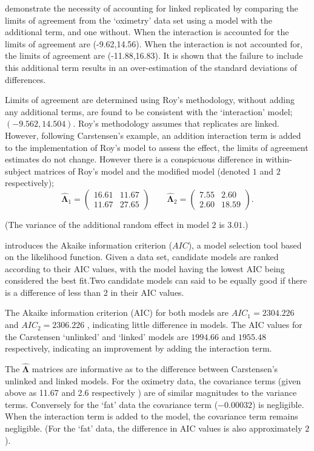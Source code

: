 \documentclass[12pt, a4paper]{report}
\theoremstyle{plain}
\theoremstyle{definition}
\theoremstyle{remark}
\begin{document}
\citet{BXC2008} demonstrate the necessity of accounting for linked replicated by comparing the limits of agreement from the `oximetry' data set using a model with the additional term, and one without. When the interaction is accounted for the limits of agreement are (-9.62,14.56). When the interaction is not accounted for, the limits of agreement are (-11.88,16.83). It is shown that the failure to include this additional term results in an over-estimation of the standard deviations of differences.

Limits of agreement are determined using Roy's methodology, without adding any additional terms, are found to be consistent with the `interaction' model; $(-9.562, 14.504 )$. Roy's methodology assumes that replicates are linked. However, following Carstensen's example, an addition interaction term is added to the implementation of Roy's model to assess the effect, the limits of agreement estimates do not change. However there is a conspicuous difference in within-subject matrices of Roy's model and the modified model (denoted $1$ and $2$ respectively);
\begin{equation}
\hat{\boldsymbol{\Lambda}}_{1}= \begin{pmatrix}
16.61 &	11.67\\
11.67 & 27.65 
\end{pmatrix}\qquad
\boldsymbol{\hat{\Lambda}}_{2}= \begin{pmatrix}
7.55 & 2.60 \\
2.60 & 18.59
\end{pmatrix}.
\end{equation}

\noindent (The variance of the additional random effect in model $2$ is $3.01$.)

\citet{akaike} introduces the Akaike information criterion ($AIC$), a model
selection tool based on the likelihood function. Given a data set, candidate models
are ranked according to their AIC values, with the model having the lowest AIC being considered the best fit.Two candidate models can said to be equally good if there is a difference of less than $2$ in their AIC values.

The Akaike information criterion (AIC) for both models are $AIC_{1} = 2304.226$ and $AIC_{2} = 2306.226$ , indicating little difference in models. The AIC values for the Carstensen `unlinked' and `linked' models are $1994.66$ and $1955.48$ respectively, indicating an improvement by adding the interaction term.

The $\boldsymbol{\hat{\Lambda}}$ matrices are informative as to the difference between Carstensen's unlinked and linked models. For the oximetry data, the covariance terms (given above as 11.67 and 2.6 respectively ) are of similar magnitudes to the variance terms. Conversely for the `fat' data the covariance term ($-0.00032$) is negligible. When the interaction term is added to the model, the covariance term remains negligible. (For the `fat' data, the difference in AIC values is also approximately $2$).
\end{document}
